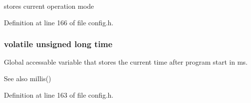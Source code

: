 stores current operation mode 



Definition at line 166 of file config.\+h.

\subsubsection[{\texorpdfstring{time}{time}}]{\setlength{\rightskip}{0pt plus 5cm}volatile unsigned long time\hspace{0.3cm}{\ttfamily [static]}}\hypertarget{group__main_ga4f944bfefd58754546ebcc7c5143442c}{}\label{group__main_ga4f944bfefd58754546ebcc7c5143442c}


Global accessable variable that stores the current time after program start in ms. 

\begin{DoxySeeAlso}{See also}
millis() 
\end{DoxySeeAlso}


Definition at line 163 of file config.\+h.


